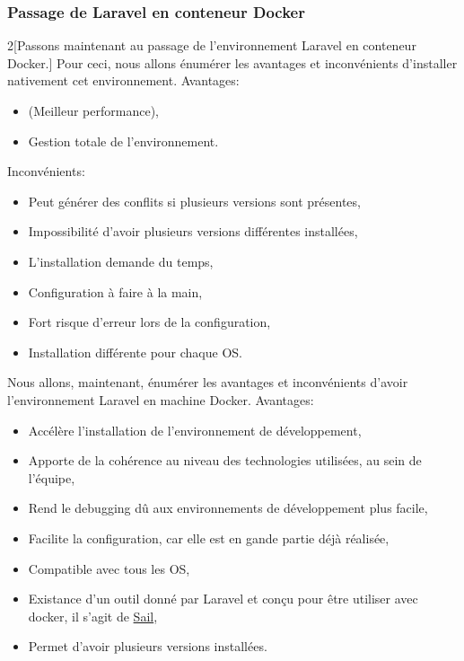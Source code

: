 \documentclass[
    iai, %
    il, %
]{heig-tb}
\begin{document}
\subsubsection{Passage de Laravel en conteneur Docker}
\begin{multicols}{2}[Passons maintenant au passage de l'environnement Laravel en conteneur Docker.]
    Pour ceci, nous allons énumérer les avantages et inconvénients d'installer nativement cet environnement.
    Avantages:
    \begin{itemize}
        \item (Meilleur performance),
        \item Gestion totale de l'environnement.
    \end{itemize}

    Inconvénients:
    \begin{itemize}
        \item Peut générer des conflits si plusieurs versions sont présentes,
        \item Impossibilité d'avoir plusieurs versions différentes installées,
        \item L'installation demande du temps,
        \item Configuration à faire à la main,
        \item Fort risque d'erreur lors de la configuration,
        \item Installation différente pour chaque OS.
    \end{itemize}

    \columnbreak
    Nous allons, maintenant, énumérer les avantages et inconvénients d'avoir l'environnement Laravel en machine Docker.\newline
    Avantages:
    \begin{itemize}
        \item Accélère l'installation de l'environnement de développement, \cite{labrecque}
        \item Apporte de la cohérence au niveau des technologies utilisées, au sein de l'équipe, \cite{labrecque, data-flair-use-cases}
        \item Rend le debugging dû aux environnements de développement plus facile, \cite{labrecque,koukia}
        \item Facilite la configuration, car elle est en gande partie déjà réalisée, \cite{data-flair-pros-cons}
        \item Compatible avec tous les OS,
        \item Existance d'un outil donné par Laravel et conçu pour être utiliser avec \Gls{docker}, il s'agit de \href{https://laravel.com/docs/9.x/sail}{Sail},
        \item Permet d'avoir plusieurs versions installées.
    \end{itemize}


\end{multicols}
\end{document}
